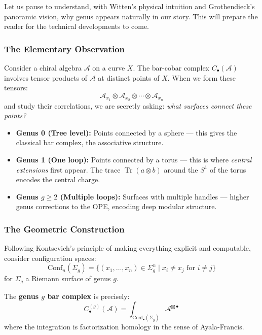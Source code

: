 Let us pause to understand, with Witten's physical intuition and Grothendieck's
panoramic vision, why genus appears naturally in our story. This will prepare
the reader for the technical developments to come.

\subsubsection{The Elementary Observation}

Consider a chiral algebra $\mathcal{A}$ on a curve $X$. The bar-cobar complex
$C_{\bullet}(\mathcal{A})$ involves tensor products of $\mathcal{A}$ at distinct
points of $X$. When we form these tensors:
$$\mathcal{A}_{x_1} \otimes \mathcal{A}_{x_2} \otimes \cdots \otimes \mathcal{A}_{x_n}$$
and study their correlations, we are secretly asking: \emph{what surfaces connect
these points?}

\begin{itemize}
\item \textbf{Genus 0 (Tree level):} Points connected by a sphere --- this gives
the classical bar complex, the associative structure.

\item \textbf{Genus 1 (One loop):} Points connected by a torus --- this is where
\emph{central extensions} first appear. The trace $\operatorname{Tr}(a \otimes b)$
around the $S^1$ of the torus encodes the central charge.

\item \textbf{Genus $g \geq 2$ (Multiple loops):} Surfaces with multiple handles ---
higher genus corrections to the OPE, encoding deep modular structure.
\end{itemize}

\subsubsection{The Geometric Construction}

Following Kontsevich's principle of making everything explicit and computable,
consider configuration spaces:
$$\mathrm{Conf}_n(\Sigma_g) = \{ (x_1, \ldots, x_n) \in \Sigma_g^n \mid x_i \neq x_j \text{ for } i \neq j \}$$
for $\Sigma_g$ a Riemann surface of genus $g$.

The \textbf{genus $g$ bar complex} is precisely:
$$C_{\bullet}^{(g)}(\mathcal{A}) = \int_{\mathrm{Conf}_{\bullet}(\Sigma_g)} 
\mathcal{A}^{\boxtimes \bullet}$$
where the integration is factorization homology in the sense of Ayala-Francis.

